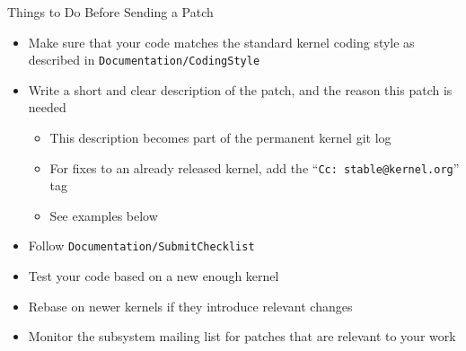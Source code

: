 \documentclass{beamer}
\begin{document}
\begin{frame}{Things to Do Before Sending a Patch}
  \begin{itemize}
  \item Make sure that your code matches the standard kernel coding
    style as described in \texttt{Documentation/CodingStyle}
  \item Write a short and clear description of the patch, and the
    reason this patch is needed
    \begin{itemize}
    \item This description becomes part of the permanent kernel git
      log
    \item For fixes to an already released kernel, add the
      ``\texttt{Cc:~stable@kernel.org}'' tag
    \item See examples below
    \end{itemize}
  \item Follow \texttt{Documentation/SubmitChecklist}
  \item Test your code based on a new enough kernel
  \item Rebase on newer kernels if they introduce relevant changes
  \item Monitor the subsystem mailing list for patches that are
    relevant to your work
  \end{itemize}
\end{frame}
\end{document}
